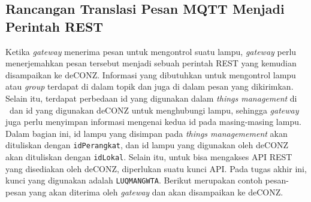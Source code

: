 \subsection{Rancangan Translasi Pesan MQTT Menjadi Perintah REST}
Ketika \textit{gateway} menerima pesan untuk mengontrol suatu lampu, \textit{gateway} perlu menerjemahkan pesan tersebut menjadi sebuah perintah REST yang kemudian disampaikan ke deCONZ. Informasi yang dibutuhkan untuk mengontrol lampu atau \textit{group} terdapat di dalam topik dan juga di dalam pesan yang dikirimkan. Selain itu, terdapat perbedaan id yang digunakan dalam \textit{things management} di \plat~dan id yang digunakan deCONZ untuk menghubungi lampu, sehingga \textit{gateway} juga perlu menyimpan informasi mengenai kedua id pada masing-masing lampu. Dalam bagian ini, id lampu yang disimpan pada \textit{things managemement} akan dituliskan dengan \texttt{idPerangkat}, dan id lampu yang digunakan oleh deCONZ akan dituliskan dengan \texttt{idLokal}. Selain itu, untuk bisa mengakses API REST yang disediakan oleh deCONZ, diperlukan suatu kunci API. Pada tugas akhir ini, kunci yang digunakan adalah \texttt{LUQMANGWTA}. Berikut merupakan contoh pesan-pesan yang akan diterima oleh \textit{gateway} dan akan disampaikan ke deCONZ.

